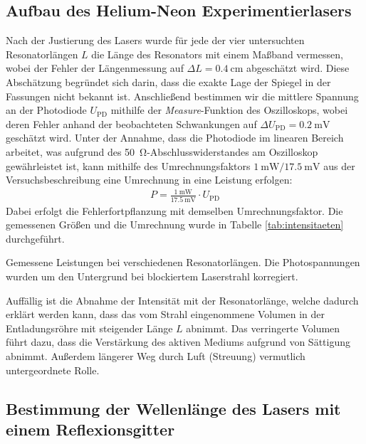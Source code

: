 \documentclass[11pt, a4paper]{article}
\numberwithin{equation}{section}
\begin{document}
\subsection{Aufbau des Helium-Neon Experimentierlasers}
Nach der Justierung des Lasers wurde für jede der vier untersuchten Resonatorlängen $L$ die Länge des Resonators mit einem Maßband vermessen, wobei der Fehler der Längenmessung auf $\Delta L = \SI{0.4}{\centi\metre}$ abgeschätzt wird.
Diese Abschätzung begründet sich darin, dass die exakte Lage der Spiegel in der Fassungen nicht bekannt ist.
Anschließend bestimmen wir die mittlere Spannung an der Photodiode $U_\mathrm{PD}$ mithilfe der \textit{Measure}-Funktion des Oszilloskops, wobei deren Fehler anhand der beobachteten Schwankungen auf $\Delta U_\mathrm{PD} = \SI{0.2}{\milli\volt}$ geschätzt wird.
Unter der Annahme, dass die Photodiode im linearen Bereich arbeitet, was aufgrund des \SI{50}{\ohm}-Abschlusswiderstandes am Oszilloskop gewährleistet ist, kann mithilfe des Umrechnungsfaktors $\SI{1}{\milli\watt} / \SI{17.5}{\milli\volt}$ aus der Versuchsbeschreibung \cite{anleitung} eine Umrechnung in eine Leistung erfolgen:
\begin{align}
	P = \frac{\SI{1}{\milli\watt}}{\SI{17.5}{\milli\volt}} \cdot U_\mathrm{PD}
	\label{eq:umrechnung_watt}
\end{align}
Dabei erfolgt die Fehlerfortpflanzung mit demselben Umrechnungsfaktor.
Die gemessenen Größen und die Umrechnung wurde in Tabelle \ref{tab:intensitaeten} durchgeführt.
\begin{table}[h]
	\centering
	
	\caption{Gemessene Leistungen bei verschiedenen Resonatorlängen. Die Photospannungen wurden um den Untergrund bei blockiertem Laserstrahl korregiert.}
	\label{tab:intensitaeten}
\end{table}
Auffällig ist die Abnahme der Intensität mit der Resonatorlänge, welche dadurch erklärt werden kann, dass das vom Strahl eingenommene Volumen in der Entladungsröhre mit steigender Länge $L$ abnimmt.
Das verringerte Volumen führt dazu, dass die Verstärkung des aktiven Mediums aufgrund von Sättigung abnimmt.
Außerdem längerer Weg durch Luft (Streuung) vermutlich untergeordnete Rolle.

\subsection{Bestimmung der Wellenlänge des Lasers mit einem Reflexionsgitter}
\end{document}
